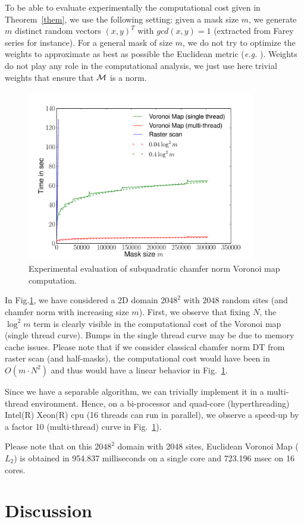 \documentclass{llncs}
\begin{document}
To be able to evaluate experimentally the
computational cost given in Theorem~\ref{them}, we use the following
setting: given a mask size $m$, we generate $m$ distinct random
vectors $(x,y)^T$ with $gcd(x,y)=1$ (extracted from Farey series for
instance). For a general mask of size $m$, we do not try to optimize
the weights to approximate as best as possible the Euclidean metric
(\emph{e.g.}  \cite{borgefors}). Weights do not play any role in the
computational analysis, we just use here trivial weights that ensure
that $\mathcal{M}$ is a norm.
\begin{figure}[htbp]
  \begin{center}
    \includegraphics[width=10cm]{data/result}
  \end{center}
  \caption{Experimental evaluation of subquadratic chamfer norm
    Voronoi map computation.}
  \label{fig:graph}
\end{figure}
In Fig.\ref{fig:graph}, we have considered a 2D domain $2048^2$ with
$2048$ random sites (and chamfer norm with increasing size
$m$). First, we observe that fixing $N$, the $\log^2{m}$ term is
clearly visible in the computational cost of the Voronoi map (single
thread curve). Bumps in the single thread curve may be due to memory
cache issues. Please note that if we consider classical chamfer norm
DT from raster scan (and half-masks), the computational cost would
have been in $O(m\cdot N^2)$ and thus would have a linear behavior in
Fig.~\ref{fig:graph}.

Since we have a separable algorithm, we can trivially implement it in
a multi-thread environment. Hence, on a bi-processor and quad-core
(hyperthreading) Intel(R) Xeon(R) cpu (16 threads can run in
parallel), we observe a speed-up by a factor 10 (multi-thread) curve
in Fig.~\ref{fig:graph}).

Please note that on this $2048^2$ domain with 2048 sites, Euclidean
Voronoi Map ($L_2$) is obtained in  954.837 milliseconds on a single
core and 723.196 msec on 16 cores.



\section{Discussion}
\label{sec:discussion}



\end{document}
